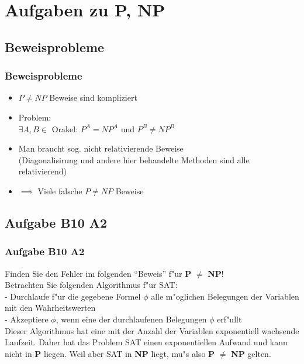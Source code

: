 




\section{Aufgaben zu P, NP}

\subsection{Beweisprobleme}
\begin{frame}
	\frametitle{Beweisprobleme}
	\begin{itemize}
		\item $ P \neq NP $ Beweise sind kompliziert
		\item Problem: \\
		$ \exists A, B \in $ Orakel: $ P^A = NP^A $ und $ P^B \neq NP^B $
		\item Man braucht sog. nicht relativierende Beweise \\
		(Diagonalisirung und andere hier behandelte Methoden sind alle relativierend)
		
		\item $ \implies $ Viele falsche $ P \neq NP $ Beweise
	\end{itemize}

\end{frame}


\subsection{Aufgabe B10 A2}
\begin{frame}
	\frametitle{Aufgabe B10 A2}
	Finden Sie den Fehler im folgenden ``Beweis'' f"ur \textbf{P} $\not=$ \textbf{NP}!\\
	Betrachten Sie folgenden Algorithmus f"ur SAT:\\[4pt]
	- Durchlaufe f"ur die gegebene Formel $\phi$ alle m"oglichen Belegungen der
	Variablen mit den Wahrheitswerten\\
	- Akzeptiere $\phi$, wenn eine der durchlaufenen Belegungen $\phi$ erf"ullt\\[4pt]
	Dieser Algorithmus hat eine mit der Anzahl der Variablen exponentiell wachsende
	Laufzeit. Daher hat das Problem SAT einen exponentiellen Aufwand und kann nicht in
	\textbf{P} liegen. Weil aber SAT in \textbf{NP} liegt, mu"s also \textbf{P} $\not=$
	\textbf{NP} gelten.
\end{frame}

